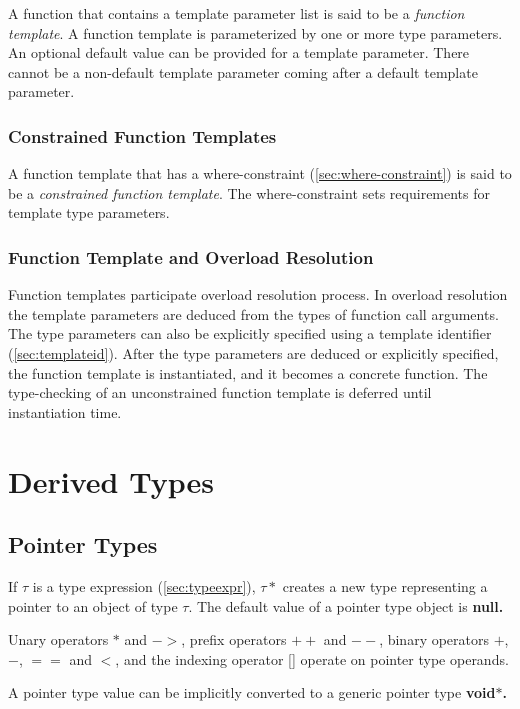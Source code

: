 \documentclass[a4paper,oneside,11pt]{article}
\begin{document}
A function that contains a template parameter list is said to be a \emph{function template}.
A function template is parameterized by one or more type parameters.
An optional default value can be provided for a template parameter. There cannot be a non-default
template parameter coming after a default template parameter.

\subsubsection{Constrained Function Templates}

A function template that has a where-constraint (\ref{sec:where-constraint}) is said to be a
\emph{constrained function template}.
The where-constraint sets requirements for template type parameters.

\subsubsection{Function Template and Overload Resolution}

Function templates participate overload resolution process.
In overload resolution the template parameters are deduced from the types of function call arguments.
The type parameters can also be explicitly specified using a template identifier (\ref{sec:templateid}).
After the type parameters are deduced or explicitly specified, the function template is instantiated,
and it becomes a concrete function.
The type-checking of an unconstrained function template is deferred until instantiation time.

\section{Derived Types}

\subsection{Pointer Types}\label{sec:pointertypes}

If $\tau$ is a type expression (\ref{sec:typeexpr}), $\tau*$ creates a new type representing a pointer to an object of type $\tau$.
The default value of a pointer type object is \bf{null}.

Unary operators $*$ and $->$, prefix operators $++$ and $--$, binary operators $+$, $-$, $==$ and $<$,
and the indexing operator [] operate on pointer type operands.

A pointer type value can be implicitly converted to a generic pointer type \bf{void$*$}.
\end{document}
